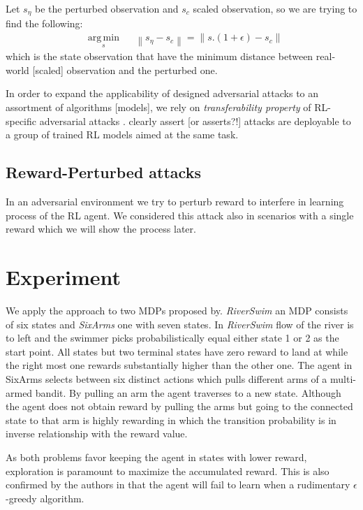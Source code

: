 \documentclass{article}
\DeclareMathOperator*{\argmin}{arg\,min}
\newcommand{\norm}[1]{\left\lVert#1\right\rVert}        %
\begin{document}
    Let $s_\eta$ be the perturbed observation and $s_c$ scaled observation, so we are trying to find the following:
    \begin{equation}
        \begin{aligned}
            & \underset{s}{\argmin}
            & & {\norm{s_\eta - s_c}} = \norm{s . (1 + \epsilon) - s_c}
        \end{aligned}
    \end{equation}
    which is the state observation that have the minimum distance between real-world [scaled] observation and the perturbed one.

    In order to expand the applicability of designed adversarial attacks to an assortment of algorithms [models], we rely on \textit{transferability property} of RL-specific adversarial attacks \cite{Szegedy2014, Papernot2016, Goodfellow2014a}. \cite{Huang2017} clearly assert [or asserts?!] attacks are deployable to a group of trained RL models aimed at the same task.

    \subsection{Reward-Perturbed attacks}
    In an adversarial environment we try to perturb reward to interfere in learning process of the RL agent. We considered this attack also in scenarios with a single reward which we will show the process later.

    \section{Experiment}
    We apply the approach to two MDPs proposed by\cite{Strehl2004}. \textit{RiverSwim} an MDP consists of six states and \textit{SixArms} one with seven states. In \textit{RiverSwim} flow of the river is to left and the swimmer picks probabilistically equal either state 1 or 2 as the start point. All states but two terminal states have zero reward to land at while the right most one rewards substantially higher than the other one. The agent in SixArms selects between six distinct actions which pulls different arms of a multi-armed bandit. By pulling an arm the agent traverses to a new state. Although the agent does not obtain reward by pulling the arms but going to the connected state to that arm is highly rewarding in which the transition probability is in inverse relationship with the reward value.

    As both problems favor keeping the agent in states with lower reward, exploration is paramount to maximize the accumulated reward. This is also confirmed by the authors in \cite{Strehl2004} that the agent will fail to learn when a rudimentary $\epsilon$-greedy algorithm.
\end{document}
